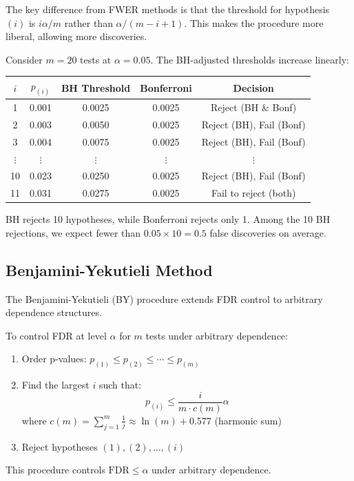 The key difference from FWER methods is that the threshold for hypothesis $(i)$ is $i\alpha/m$ rather than $\alpha/(m-i+1)$. This makes the procedure more liberal, allowing more discoveries.

\begin{example}
Consider $m = 20$ tests at $\alpha = 0.05$. The BH-adjusted thresholds increase linearly:

\begin{center}
\begin{tabular}{ccccc}
\toprule
$i$ & $p_{(i)}$ & BH Threshold & Bonferroni & Decision \\
\midrule
1 & 0.001 & 0.0025 & 0.0025 & Reject (BH \& Bonf) \\
2 & 0.003 & 0.0050 & 0.0025 & Reject (BH), Fail (Bonf) \\
3 & 0.004 & 0.0075 & 0.0025 & Reject (BH), Fail (Bonf) \\
$\vdots$ & $\vdots$ & $\vdots$ & $\vdots$ & $\vdots$ \\
10 & 0.023 & 0.0250 & 0.0025 & Reject (BH), Fail (Bonf) \\
11 & 0.031 & 0.0275 & 0.0025 & Fail to reject (both) \\
\bottomrule
\end{tabular}
\end{center}

BH rejects 10 hypotheses, while Bonferroni rejects only 1. Among the 10 BH rejections, we expect fewer than $0.05 \times 10 = 0.5$ false discoveries on average.
\end{example}

\subsection{Benjamini-Yekutieli Method}

The Benjamini-Yekutieli (BY) procedure extends FDR control to arbitrary dependence structures.

\begin{theorem}
To control FDR at level $\alpha$ for $m$ tests under arbitrary dependence:
\begin{enumerate}
    \item Order p-values: $p_{(1)} \leq p_{(2)} \leq \cdots \leq p_{(m)}$
    \item Find the largest $i$ such that:
    \begin{equation}
    p_{(i)} \leq \frac{i}{m \cdot c(m)} \alpha
    \end{equation}
    where $c(m) = \sum_{j=1}^{m} \frac{1}{j} \approx \ln(m) + 0.577$ (harmonic sum)
    \item Reject hypotheses $(1), (2), \ldots, (i)$
\end{enumerate}

This procedure controls $\text{FDR} \leq \alpha$ under arbitrary dependence.
\end{theorem}

